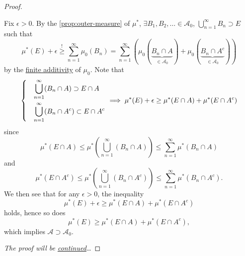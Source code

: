 \begin{proof}
\begin{explanation}
		Fix \(\epsilon >0\). By the \autoref{prop:outer-measure} of \(\mu^{\ast} \), \(\exists B_1, B_2, \dots \in \mathcal{A}_0\),
		\(\bigcup_{n=1}^{\infty} B_{n}\supset E\) such that
		\[
			\mu^{\ast} (E) + \epsilon \overset{\hyperref[prop:outer-measure]{!}}{\geq} \sum_{n=1}^{\infty} \mu_0(B_{n}) = \sum_{n=1}^{\infty} \left(\mu_0(\underbrace{B_{n}\cap A}_{\in \mathcal{A} _0}) + \mu_0(\underbrace{B_{n}\cap A^{c}}_{\in \mathcal{A} _0} )\right)
		\]
		by the \hyperref[def:pre-measure-finite-additivity]{finite additivity} of \(\mu_0\). Note that
		\[
			\begin{dcases}
				 & \bigcup_{n=1}^{\infty} (B_{n}\cap A)      \supset E\cap A     \\
				 & \bigcup_{n=1}^{\infty} (B_{n}\cap A^{c})  \subset E\cap A^{c}
			\end{dcases}\implies \mu^{\ast} (E)+\epsilon \geq \mu^{\ast} (E\cap A) + \mu^{\ast} (E\cap A^{c} )
		\]
		since
		\[
			\mu^{\ast} (E\cap A)\leq \mu^{\ast} \left(\bigcup_{n=1}^{\infty} (B_{n}\cap A)\right)\leq \sum_{n=1}^{\infty} \mu^{\ast} (B_{n}\cap A)
		\]
		and
		\[
			\mu^{\ast} (E\cap A^{c} )\leq \mu^{\ast} \left(\bigcup_{n=1}^{\infty} (B_{n}\cap A^{c})\right) \leq \sum_{n=1}^{\infty} \mu^{\ast} (B_{n}\cap A^{c} ).
		\]
		We then see that for any \(\epsilon >0\), the inequality
		\[
			\mu^{\ast} (E)+\epsilon \geq \mu^{\ast} (E\cap A) + \mu^{\ast} (E\cap A^{c} )
		\]
		holds, hence so does
		\[
			\mu^{\ast} (E) \geq \mu^{\ast} (E\cap A) + \mu^{\ast} (E\cap A^{c} ),
		\]
		which implies \(\mathcal{A} \supset \mathcal{A} _0\).
	\end{explanation}
	\emph{The proof will be \hyperref[pf:thm:Hahn-Kolmogorov-cont]{continued}\dots}
\end{proof}